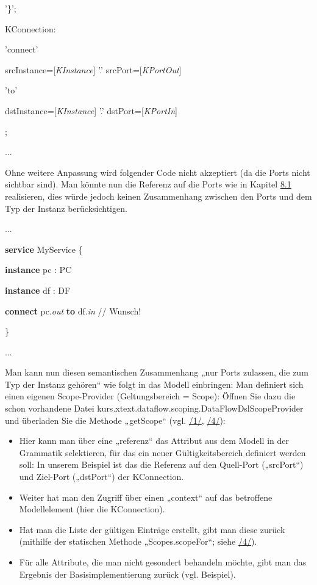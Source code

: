 \documentclass[a4]{article}
\providecommand{\tightlist}{%
  \setlength{\itemsep}{0pt}\setlength{\parskip}{0pt}}
\begin{document}
'\}';

KConnection:

'connect'

srcInstance={[}\emph{KInstance}{]} '.' srcPort={[}\emph{KPortOut}{]}

'to'

dstInstance={[}\emph{KInstance}{]} '.' dstPort={[}\emph{KPortIn}{]}

;

...

Ohne weitere Anpassung wird folgender Code nicht akzeptiert (da die
Ports nicht sichtbar sind). Man könnte nun die Referenz auf die Ports
wie in Kapitel \protect\hyperlink{anchor-43}{8.1} realisieren, dies
würde jedoch keinen Zusammenhang zwischen den Ports und dem Typ der
Instanz berücksichtigen.

...

\textbf{service} MyService \{

\textbf{instance} pc : PC

\textbf{instance} df : DF

\textbf{connect} pc.\emph{out} \textbf{to} df.\emph{in} // Wunsch!

\}

...

Man kann nun diesen semantischen Zusammenhang „nur Ports zulassen, die
zum Typ der Instanz gehören`` wie folgt in das Modell einbringen: Man
definiert sich einen eigenen Scope-Provider (Geltungsbereich = Scope):
Öffnen Sie dazu die schon vorhandene Datei
kurs.xtext.dataflow.scoping.DataFlowDslScopeProvider und überladen Sie
die Methode „getScope`` (vgl. \protect\hyperlink{anchor-1}{/1/},
\protect\hyperlink{anchor-4}{/4/}):

\begin{itemize}
\tightlist
\item
  Hier kann man über eine „referenz`` das Attribut aus dem Modell in der
  Grammatik selektieren, für das ein neuer Gültigkeitsbereich definiert
  werden soll: In unserem Beispiel ist das die Referenz auf den
  Quell-Port („srcPort``) und Ziel-Port („dstPort``) der KConnection.
\item
  Weiter hat man den Zugriff über einen „context`` auf das betroffene
  Modellelement (hier die KConnection).
\item
  Hat man die Liste der gültigen Einträge erstellt, gibt man diese
  zurück (mithilfe der statischen Methode „Scopes.scopeFor``; siehe
  \protect\hyperlink{anchor-4}{/4/}).
\item
  Für alle Attribute, die man nicht gesondert behandeln möchte, gibt man
  das Ergebnis der Basisimplementierung zurück (vgl. Beispiel).
\end{itemize}
\end{document}
